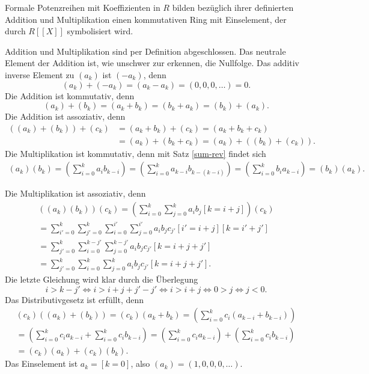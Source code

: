 \begin{Satz}
Formale Potenzreihen mit Koeffizienten in $R$ bilden bezüglich ihrer
definierten Addition und Multiplikation einen kommutativen
Ring mit Einselement, der durch $R[[X]]$ symbolisiert wird.
\end{Satz}
\begin{Beweis}
Addition und Multiplikation sind per Definition abgeschlossen.
Das neutrale Element der Addition ist, wie unschwer zur erkennen,
die Nullfolge. Das additiv inverse Element zu $(a_k)$ ist $(-a_k)$, denn%
\[(a_k) + (-a_k) = (a_k - a_k) = (0, 0, 0, \ldots) = 0.\]
Die Addition ist kommutativ, denn
\[(a_k) + (b_k) = (a_k + b_k) = (b_k + a_k) = (b_k) + (a_k).\]
Die Addition ist assoziativ, denn
\begin{align*}
((a_k) + (b_k)) + (c_k) &= (a_k + b_k) + (c_k) = (a_k + b_k + c_k)\\
&= (a_k) + (b_k + c_k) = (a_k) + ((b_k) + (c_k)).
\end{align*}
Die Multiplikation ist kommutativ, denn mit Satz \ref{sum-rev}
findet sich
\begin{gather*}
\textstyle (a_k)(b_k) = (\sum_{i=0}^k a_i b_{k-i})
= (\sum_{i=0}^k a_{k-i}b_{k-(k-i)})
= (\sum_{i=0}^k b_i a_{k-i}) = (b_k)(a_k).
\end{gather*}
\end{Beweis}
Die Multiplikation ist assoziativ, denn
\begin{gather*}
\textstyle
((a_k)(b_k))(c_k) = (\sum_{i=0}^k\sum_{j=0}^k a_i b_j[k{=}i{+}j])(c_k)\\
\textstyle
= \sum_{i'=0}^k\sum_{j'=0}^k\sum_{i=0}^{i'}\sum_{j=0}^{i'} a_i b_j c_{j'}[i'{=}i{+}j][k{=}i'{+}j']\\
\textstyle
= \sum_{j'=0}^k\sum_{i=0}^{k-j'}\sum_{j=0}^{k-j'} a_i b_j c_{j'}[k{=}i{+}j{+}j']\\
\textstyle
= \sum_{j'=0}^k\sum_{i=0}^k\sum_{j=0}^k a_i b_j c_{j'}[k{=}i{+}j{+}j'].
\end{gather*}
Die letzte Gleichung wird klar durch die Überlegung
\[i > k-j'\iff i > i+j+j'-j'\iff i > i+j \iff 0 > j\iff j < 0.\]
Das Distributivgesetz ist erfüllt, denn
\begin{gather*}
\textstyle (c_k)((a_k)+(b_k)) =  (c_k)(a_k + b_k)
= (\sum_{i=0}^k c_i (a_{k-i} + b_{k-i}))\\
\textstyle
= (\sum_{i=0}^k c_i a_{k-i} + \sum_{i=0}^k c_i b_{k-i})
= (\sum_{i=0}^k c_i a_{k-i}) + (\sum_{i=0}^k c_i b_{k-i})\\
\textstyle
= (c_k)(a_k) + (c_k)(b_k).
\end{gather*}
Das Einselement ist $a_k=[k=0]$, also $(a_k) = (1,0,0,0,\ldots)$.\,\qedsymbol

